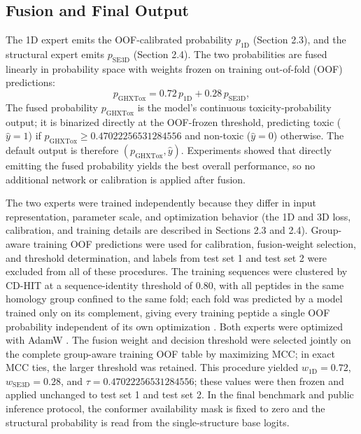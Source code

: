 \documentclass[12pt]{article}
\begin{document}
\subsection{Fusion and Final Output}
The 1D expert emits the OOF-calibrated probability $p_{\mathrm{1D}}$
(Section 2.3), and the structural expert emits $p_{\mathrm{SE3D}}$
(Section 2.4). The two probabilities are fused linearly in probability space
with weights frozen on training out-of-fold (OOF) predictions:
\begin{equation}
    p_{\mathrm{GHXTox}} = 0.72\,p_{\mathrm{1D}} + 0.28\,p_{\mathrm{SE3D}},
    \label{eq:fusion}
\end{equation}
The fused probability $p_{\mathrm{GHXTox}}$ is the model's continuous
toxicity-probability output; it is binarized directly at the OOF-frozen
threshold, predicting toxic ($\hat y = 1$) if
$p_{\mathrm{GHXTox}} \geq 0.47022256531284556$ and non-toxic ($\hat y = 0$)
otherwise. The default output is therefore $(p_{\mathrm{GHXTox}}, \hat y)$.
Experiments showed that directly emitting the fused probability yields the
best overall performance, so no additional network or calibration is applied
after fusion.

The two experts were trained independently because they differ in input
representation, parameter scale, and optimization behavior (the 1D and 3D
loss, calibration, and training details are described in Sections 2.3 and
2.4). Group-aware training OOF predictions were used for calibration,
fusion-weight selection, and threshold determination, and labels from test set 1 and test set 2
were excluded from all of these procedures. The training sequences were
clustered by CD-HIT at a sequence-identity threshold of 0.80, with all
peptides in the same homology group confined to the same fold; each fold was
predicted by a model trained only on its complement, giving every training
peptide a single OOF probability independent of its own optimization
\cite{fu2012cdhit}. Both
experts were optimized with AdamW \cite{loshchilov2019adamw}. The fusion
weight and decision threshold were selected jointly on the complete
group-aware training OOF table by maximizing MCC; in exact MCC ties, the
larger threshold was retained. This procedure yielded $w_{\mathrm{1D}}=0.72$,
$w_{\mathrm{SE3D}}=0.28$, and $\tau = 0.47022256531284556$; these values
were then frozen and applied unchanged to test set 1 and test set 2. In the final
benchmark and public inference protocol, the conformer availability mask is
fixed to zero and the structural probability is read from the
single-structure base logits.
\end{document}
